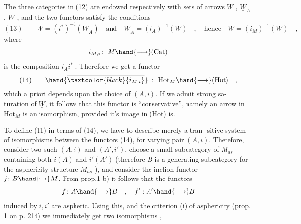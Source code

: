 
The three categories in (12) are endowed respectively with sets of arrows
$W$ , $\underline{W}_A$ , $\underline{W}$ , and the two functors satisfy the conditions
\[ (13) \qquad W = (i^{*})^{-1}(\underline{W}_A) \quad \text{and} \quad \underline{W}_A = (i_A)^{-1}(\underline{W}) \quad , \quad \text{hence} \quad W = (i_M)^{-1}(\underline{W}) \quad , \]
where
\[ i_{M,i}\colon \ M \hand{\longrightarrow} (\mathrm{Cat}) \]
is the composition $i_A i^{*}$ . Therefore we get a functor
\[ (14) \qquad \hand{\overline{\textcolor{black}{i_{M,i}}}} \ : \ \mathrm{Hot}_M \hand{\longrightarrow} (\mathrm{Hot}) \quad , \]
which a priori depends upon the choice of $(A,i)$. If we admit strong sa-%
turation of $\underline{W}$, it follows that this functor is ``conservative'', namely
an arrow in $\mathrm{Hot}_M$ is an isomorphism, provided it's image in (Hot) is.

To define (11) in terms of (14), we have to describe merely a tran-%
sitive system of isomorphisms between the functors (14), for varying
pair $(A,i)$. Therefore, consider two such $(A,i)$ and $(A',i')$, choose
a small  subcategory  of $M_{as}$ containing both $i(A)$ and $i'(A')$ (therefore
$B$ is a generating subcategory for the asphericity structure $M_{as}$ ), and
consider the inclion functor $j\colon B \hand{\hookrightarrow} M$. From prop.1 b) it follows
that the functors
\[ f\colon A \hand{\longrightarrow} B \quad , \quad f' : A' \hand{\longrightarrow} B \]
induced by $i,i'$ are aspheric. Using this, and the criterion (i) of
asphericity (prop. 1 on p. 214) we immediately get two isomorphisms
,

